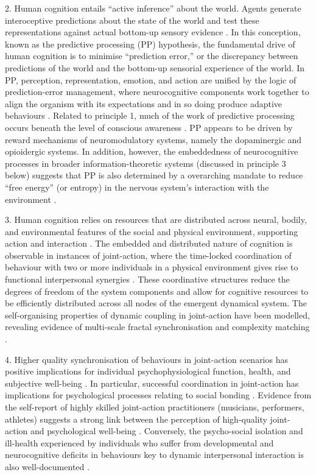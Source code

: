 \begin{CJK}{UTF8}{gbsn}
2. Human cognition entails ``active inference'' \citep{Friston2010} about the world. Agents generate interoceptive predictions about the state of the world and test these representations against actual bottom-up sensory evidence \citep{Clark2013}.  In this conception, known as the predictive processing (PP) hypothesis, the fundamental drive of human cognition is to minimise ``prediction error,'' or the discrepancy between predictions of the world and the bottom-up sensorial experience of the world. In PP, perception, representation, emotion, and action are unified by the logic of prediction-error management, where neurocognitive components work together to align the organism with its expectations and in so doing produce adaptive behaviours \citep{Pezzulo2014}. Related to principle 1, much of the work of predictive processing occurs beneath the level of conscious awareness \citep{Frith2007,Clark2013}.
PP appears to be driven by reward mechanisms of neuromodulatory systems, namely the dopaminergic \citep{Schultz2016} and opioidergic \citep{Laurent2014} systems.  In addition, however, the embeddedness of neurocognitive processes in broader information-theoretic systems (discussed in principle 3 below) suggests that PP is also determined by a overarching mandate to reduce ``free energy'' (or entropy) in the nervous system's interaction with the environment \citep{Friston2010}.

3. Human cognition relies on resources that are distributed across neural, bodily, and environmental features of the social and physical environment, supporting action and interaction \citep{Hutchins1995,Kirsh1995,Smith2004}.  The embedded and distributed nature of cognition is observable in instances of joint-action, where the time-locked coordination of behaviour with two or more individuals in a physical environment gives rise to functional interpersonal synergies \citep{Riley2011,Coey2012}.  These coordinative structures reduce the degrees of freedom of the system components and allow for cognitive resources to be efficiently distributed across all nodes of the emergent dynamical system. The self-organising properties of dynamic coupling in joint-action have been modelled, revealing evidence of multi-scale fractal synchronisation and complexity matching \citep{Schmidt2011,Richardson2012}.

4. Higher quality synchronisation of behaviours in joint-action scenarios has positive implications for individual psychophysiological function, health, and subjective well-being \citep{Wheatley2012}.  In particular, successful coordination in joint-action has implications for psychological processes relating to social bonding \citep{Marsh2009,Launay2016}.  Evidence from the self-report of highly skilled joint-action practitioners (musicians, performers, athletes) suggests a strong link between the perception of high-quality joint-action and psychological well-being \citep{Jackson1995,Jackson1992}.  Conversely, the psycho-social isolation and ill-health experienced by individuals who suffer from developmental and neurocognitive deficits in behaviours key to dynamic interpersonal interaction is also well-documented \citep[e.g.][]{Blakemore2005,Baron-Cohen1991}.


\end{CJK}
